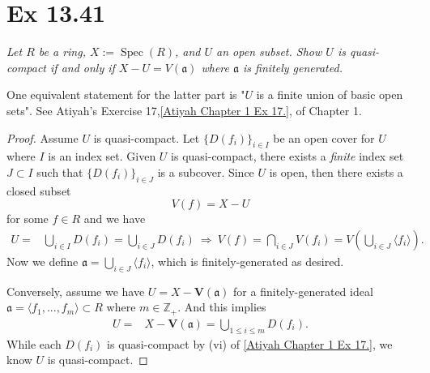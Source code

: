 
\section{Ex 13.41}\label{Altman Ex 13.41} \textit{Let $R$ be a ring, $X := \operatorname{Spec}(R)$, and $U$ an open subset. Show $U$ is quasi-compact if and only if $X-U = V(\mathfrak a)$ where $\mathfrak a$ is finitely generated.}
    
One equivalent statement for the latter part is "$U$ is a finite union of basic open sets". See Atiyah's Exercise 17,\ref{Atiyah Chapter 1 Ex 17.}, of Chapter 1. 
\begin{proof}
Assume $U$ is quasi-compact. Let $\{D(f_i)\}_{i\in I}$ be an open cover for $U$ where $I$ is an index set. Given $U$ is quasi-compact, there exists a \textit{finite} index set $J\subset I$ such that $\{D(f_i)\}_{i\in J}$ is a subcover. Since $U$ is open, then there exists a closed subset 
$$V(f)=X-U$$ for some $f\in R$ and we have 
\begin{align*}
    U =& \bigcup_{i\in I} D(f_i) = \bigcup_{i\in J} D(f_i)
    ~\Rightarrow~ V(f) = \bigcap_{i\in J}V(f_i) = V\left(\bigcup_{i\in J} \langle f_i\rangle\right).
\end{align*}
Now we define $\mathfrak a=\bigcup_{i\in J} \langle f_i\rangle$, which is finitely-generated as desired.

Conversely, assume we have $U=X-\mathbf V(\mathfrak a)$ for a finitely-generated ideal $\mathfrak a=\langle f_1,...,f_m\rangle\subset R$ where $m\in\mathbb Z_+$. And this implies 
\begin{align*}
    U =& X-\mathbf V(\mathfrak a) = \bigcup_{1\leq i\leq m}D(f_i).
\end{align*}While each $D(f_i)$ is quasi-compact by (vi) of \ref{Atiyah Chapter 1 Ex 17.}, we know $U$ is quasi-compact. 
\end{proof}